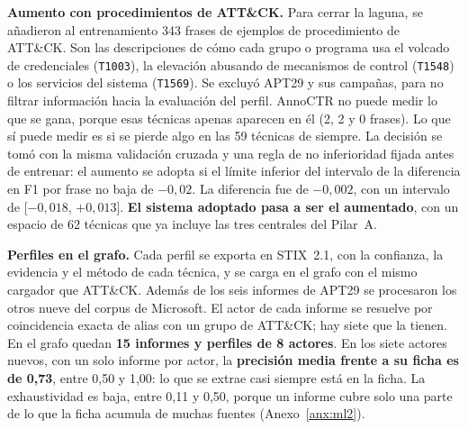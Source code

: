 \medskip\noindent\textbf{Aumento con procedimientos de ATT\&CK.} Para cerrar la laguna, se añadieron
al entrenamiento 343 frases de ejemplos de procedimiento de ATT\&CK. Son las descripciones de cómo
cada grupo o programa usa el volcado de credenciales (\texttt{T1003}), la elevación abusando de
mecanismos de control (\texttt{T1548}) o los servicios del sistema (\texttt{T1569}). Se excluyó
APT29 y sus campañas, para no filtrar información hacia la evaluación del perfil. AnnoCTR no puede
medir lo que se gana, porque esas técnicas apenas aparecen en él (2, 2 y 0 frases). Lo que sí puede
medir es si se pierde algo en las 59 técnicas de siempre. La decisión se tomó con la misma
validación cruzada y una regla de no inferioridad fijada antes de entrenar: el aumento se adopta si
el límite inferior del intervalo de la diferencia en F1 por frase no baja de $-0{,}02$. La diferencia
fue de $-0{,}002$, con un intervalo de [$-0{,}018$, $+0{,}013$]. \textbf{El sistema adoptado pasa a ser el
aumentado}, con un espacio de 62 técnicas que ya incluye las tres centrales del Pilar~A.

\medskip\noindent\textbf{Perfiles en el grafo.} Cada perfil se exporta en STIX~2.1, con la confianza,
la evidencia y el método de cada técnica, y se carga en el grafo con el mismo cargador que
ATT\&CK. Además de los seis informes de APT29 se procesaron los otros nueve del corpus de Microsoft.
El actor de cada informe se resuelve por coincidencia exacta de alias con un grupo de ATT\&CK; hay
siete que la tienen. En el grafo quedan \textbf{15 informes y perfiles de 8 actores}. En los siete
actores nuevos, con un solo informe por actor, la \textbf{precisión media frente a su ficha es de
0,73}, entre 0,50 y 1,00: lo que se extrae casi siempre está en la ficha. La exhaustividad es baja,
entre 0,11 y 0,50, porque un informe cubre solo una parte de lo que la ficha acumula de muchas
fuentes (Anexo~\ref{anx:ml2}).
